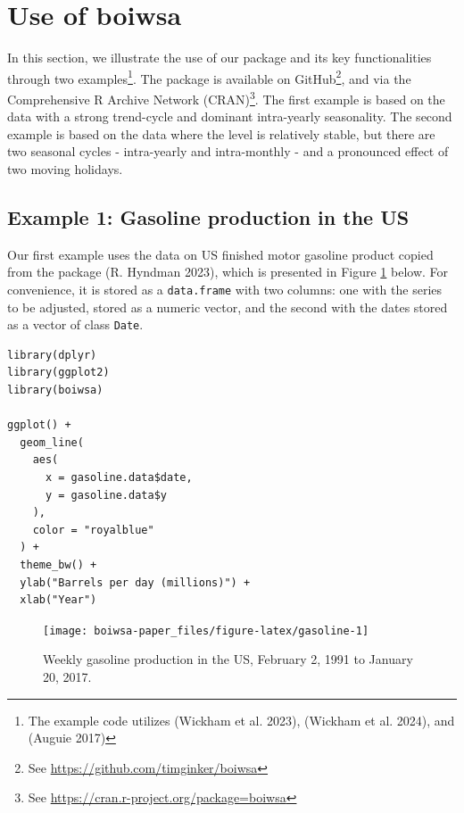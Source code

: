 \hypertarget{use-of-boiwsa}{%
\section{Use of boiwsa}\label{use-of-boiwsa}}

In this section, we illustrate the use of our package and its key functionalities through two examples\footnote{The example code utilizes  (Wickham et al. 2023),  (Wickham et al. 2024), and  (Auguie 2017)}. The package is available on GitHub\footnote{See \url{https://github.com/timginker/boiwsa}}, and via the Comprehensive R Archive Network (CRAN)\footnote{See \url{https://cran.r-project.org/package=boiwsa}}. The first example is based on the data with a strong trend-cycle and dominant intra-yearly seasonality. The second example is based on the data where the level is relatively stable, but there are two seasonal cycles - intra-yearly and intra-monthly - and a pronounced effect of two moving holidays.

\hypertarget{example-1-gasoline-production-in-the-us}{%
\subsection{Example 1: Gasoline production in the US}\label{example-1-gasoline-production-in-the-us}}

Our first example uses the data on US finished motor gasoline product copied from the  package (R. Hyndman 2023), which is presented in Figure \ref{fig:gasoline} below. For convenience, it is stored as a \texttt{data.frame} with two columns: one with the series to be adjusted, stored as a numeric vector, and the second with the dates stored as a vector of class \texttt{Date}.

\begin{verbatim}
library(dplyr)
library(ggplot2)
library(boiwsa)

ggplot() +
  geom_line(
    aes(
      x = gasoline.data$date,
      y = gasoline.data$y
    ),
    color = "royalblue"
  ) +
  theme_bw() +
  ylab("Barrels per day (millions)") +
  xlab("Year")
\end{verbatim}

\begin{figure}[H]

{\centering \texttt{[image: boiwsa-paper\_files/figure-latex/gasoline-1]} 

}

\caption{Weekly gasoline production in the US, February 2, 1991 to January 20, 2017.}\label{fig:gasoline}
\end{figure}

